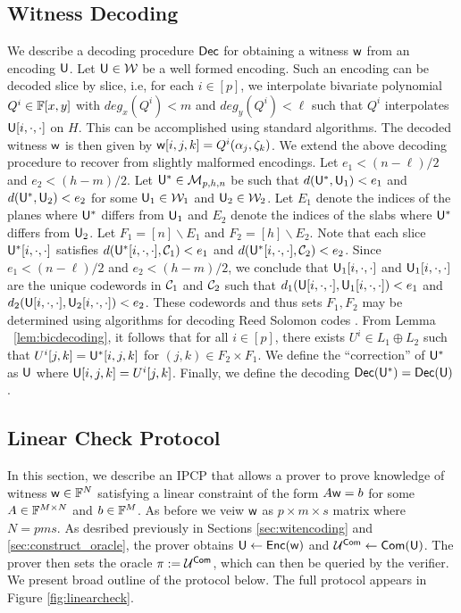 \subsection{Witness Decoding}\label{sec:witdecoding}
We describe a decoding procedure $\mathsf{Dec}$ for obtaining a witness $\mathsf{w}$ from an encoding
$\mathsf{U}$. Let $\mathsf{U}\in \mathcal{W}$ be a well formed encoding. Such an encoding can
be decoded slice by slice, i.e, for each $i\in [p]$, we interpolate bivariate
polynomial $Q^i\in \mathbb{F}[x,y]$ with $deg_x(Q^i)<m$ and $deg_y(Q^i)<\ell$ such that
$Q^i$ interpolates $\mathsf{U}[i,\cdot,\cdot]$ on $H$. This can be accomplished using
standard algorithms. The decoded witness $\mathsf{w}$ is then given by
$\mathsf{w}[i,j,k]=Q^i(\alpha_j,\zeta_k)$. We extend the above decoding procedure to
recover from slightly malformed encodings. Let
$e_1<(n-\ell)/2$ and $e_2<(h-m)/2$. Let $\mathsf{U}^*\in \mathcal{M}_{p,h,n}$ be such
that $d(\mathsf{U}^*,\mathsf{U}_1)<e_1$ and $d(\mathsf{U}^*,\mathsf{U}_2)<e_2$ for some $\mathsf{U}_1\in
\mathcal{W}_1$ and $\mathsf{U}_2\in \mathcal{W}_2$. Let $E_1$ denote
the indices of the planes where $\mathsf{U}^*$ differs from $\mathsf{U}_1$ and 
$E_2$ denote the indices of the slabs where $\mathsf{U}^*$ differs from $\mathsf{U}_2$.
Let $F_1=[n]\backslash E_1$ and
$F_2=[h]\backslash E_2$. Note that each
slice $\mathsf{U}^*[i,\cdot,\cdot]$ satisfies
$d(\mathsf{U}^*[i,\cdot,\cdot],\mathcal{C}_1)<e_1$  and
$d(\mathsf{U}^*[i,\cdot,\cdot],\mathcal{C}_2)<e_2$. Since $e_1<(n-\ell)/2$ and
$e_2<(h-m)/2$, we conclude that $\mathsf{U}_1[i,\cdot,\cdot]$ and
$\mathsf{U}_1[i,\cdot,\cdot]$ are the unique codewords in $\mathcal{C}_1$ and $\mathcal{C}_2$
such that $d_1(\mathsf{U}[i,\cdot,\cdot],\mathsf{U}_1[i,\cdot,\cdot])<e_1$ and
$d_2(\mathsf{U}[i,\cdot,\cdot],\mathsf{U}_2[i,\cdot,\cdot])<e_2$. These codewords and thus
sets $F_1,F_2$ may be
determined using algorithms for decoding Reed Solomon codes \cite{CodingTheory}.
 From Lemma ~\ref{lem:bicdecoding}, it follows that for all $i\in [p]$, there exists $U^i\in L_1\oplus L_2$ such
that $U^i[j,k]=\mathsf{U}^*[i,j,k]$ for $(j,k)\in F_2\times F_1$. We define the
``correction'' of $\mathsf{U}^*$ as $\mathsf{U}$ where
$\mathsf{U}[i,j,k]=U^i[j,k]$. Finally, we define the decoding $\mathsf{Dec}(\mathsf{U}^*) =
\mathsf{Dec}(\mathsf{U})$.


\subsection{Linear Check Protocol}\label{sec:lincheck}
In this section, we describe an IPCP that allows a prover to prove knowledge of
witness $\mathsf{w}\in \mathbb{F}^N$ satisfying a linear constraint of the form $A\mathsf{w} = b$
for some $A\in \mathbb{F}^{M\times N}$ and $b\in \mathbb{F}^M$. As before we veiw $\mathsf{w}$ as
$p\times m\times s$ matrix where $N=pms$. As desribed previously in Sections
\ref{sec:witencoding} and \ref{sec:construct_oracle}, the prover obtains $\mathsf{U}\gets 
\mathsf{Enc}(\mathsf{w})$ and $\mathcal{U}^{\mathsf{Com}}\gets \mathsf{Com}(\mathsf{U})$. The prover then sets the oracle 
$\pi := \mathcal{U}^{\mathsf{Com}}$, which can then be queried by the verifier. We present broad
 outline of the protocol below. The full protocol appears in
Figure \ref{fig:linearcheck}.\smallskip

